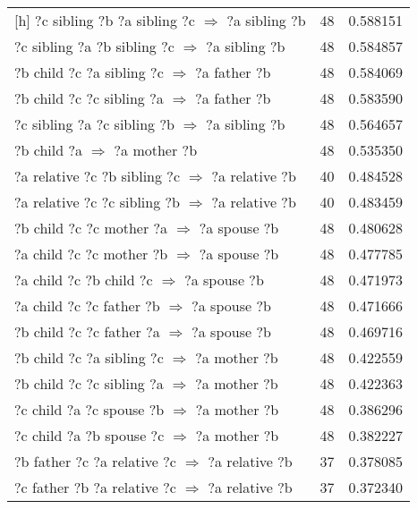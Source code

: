 \begin{longtable}{lrr}[h]
   ?c  sibling  ?b  ?a  sibling  ?c   $\Rightarrow$ ?a  sibling  ?b &           48 &        0.588151 \\
   ?c  sibling  ?a  ?b  sibling  ?c   $\Rightarrow$ ?a  sibling  ?b &           48 &        0.584857 \\
      ?b  child  ?c  ?a  sibling  ?c   $\Rightarrow$ ?a  father  ?b &           48 &        0.584069 \\
      ?b  child  ?c  ?c  sibling  ?a   $\Rightarrow$ ?a  father  ?b &           48 &        0.583590 \\
   ?c  sibling  ?a  ?c  sibling  ?b   $\Rightarrow$ ?a  sibling  ?b &           48 &        0.564657 \\
                       ?b  child  ?a   $\Rightarrow$ ?a  mother  ?b &           48 &        0.535350 \\
 ?a  relative  ?c  ?b  sibling  ?c   $\Rightarrow$ ?a  relative  ?b &           40 &        0.484528 \\
 ?a  relative  ?c  ?c  sibling  ?b   $\Rightarrow$ ?a  relative  ?b &           40 &        0.483459 \\
       ?b  child  ?c  ?c  mother  ?a   $\Rightarrow$ ?a  spouse  ?b &           48 &        0.480628 \\
       ?a  child  ?c  ?c  mother  ?b   $\Rightarrow$ ?a  spouse  ?b &           48 &        0.477785 \\
        ?a  child  ?c  ?b  child  ?c   $\Rightarrow$ ?a  spouse  ?b &           48 &        0.471973 \\
       ?a  child  ?c  ?c  father  ?b   $\Rightarrow$ ?a  spouse  ?b &           48 &        0.471666 \\
       ?b  child  ?c  ?c  father  ?a   $\Rightarrow$ ?a  spouse  ?b &           48 &        0.469716 \\
      ?b  child  ?c  ?a  sibling  ?c   $\Rightarrow$ ?a  mother  ?b &           48 &        0.422559 \\
      ?b  child  ?c  ?c  sibling  ?a   $\Rightarrow$ ?a  mother  ?b &           48 &        0.422363 \\
       ?c  child  ?a  ?c  spouse  ?b   $\Rightarrow$ ?a  mother  ?b &           48 &        0.386296 \\
       ?c  child  ?a  ?b  spouse  ?c   $\Rightarrow$ ?a  mother  ?b &           48 &        0.382227 \\
  ?b  father  ?c  ?a  relative  ?c   $\Rightarrow$ ?a  relative  ?b &           37 &        0.378085 \\
  ?c  father  ?b  ?a  relative  ?c   $\Rightarrow$ ?a  relative  ?b &           37 &        0.372340 \\

\end{longtable}
